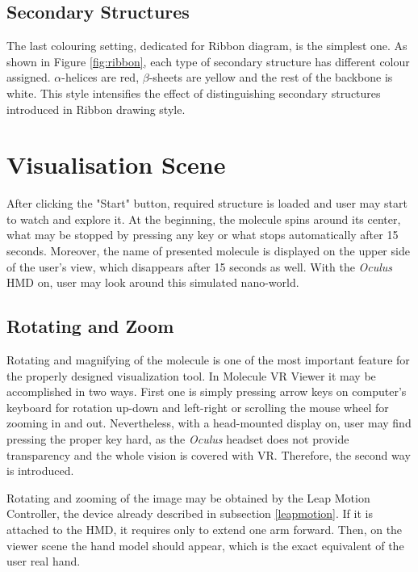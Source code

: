 \subsection{Secondary Structures}
The last colouring setting, dedicated for Ribbon diagram, is the simplest one. As shown in Figure \ref{fig:ribbon}, each type of secondary structure has different colour assigned. $\alpha$-helices are red, $\beta$-sheets are yellow and the rest of the backbone is white. This style intensifies the effect of distinguishing secondary structures introduced in Ribbon drawing style.

\section{Visualisation Scene} %

After clicking the "Start" button, required structure is loaded and user may start to watch and explore it. At the beginning, the molecule spins around its center, what may be stopped by pressing any key or what stops automatically after 15 seconds. Moreover, the name of presented molecule is displayed on the upper side of the user's view, which disappears after 15 seconds as well. With the \textit{Oculus} HMD on, user may look around this simulated nano-world.

\subsection{Rotating and Zoom}

Rotating and magnifying of the molecule is one of the most important feature for the properly designed visualization tool. In Molecule VR Viewer it may be accomplished in two ways. First one is simply pressing arrow keys on computer's keyboard for rotation up-down and left-right or scrolling the mouse wheel for zooming in and out. Nevertheless, with a head-mounted display on, user may find pressing the proper key hard, as the \textit{Oculus} headset does not provide transparency and the whole vision is covered with VR. Therefore, the second way is introduced.

Rotating and zooming of the image may be obtained by the Leap Motion Controller, the device already described in subsection \ref{leapmotion}. If it is attached to the HMD, it requires only to extend one arm forward. Then, on the viewer scene the hand model should appear, which is the exact equivalent of the user real hand.

